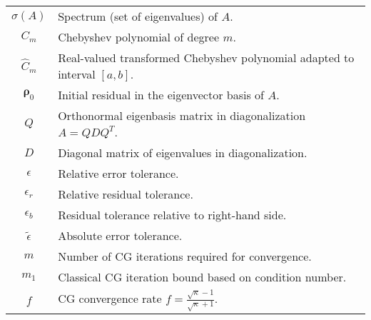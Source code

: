\begin{longtable}{c p{10cm}}
    $\sigma(A)$                      & Spectrum (set of eigenvalues) of $A$.                                                                       \\
    $C_m$                            & Chebyshev polynomial of degree $m$.                                                                         \\
    $\hat{C}_m$                      & Real-valued transformed Chebyshev polynomial adapted to interval $[a,b]$.                                   \\
    $\mathbf{\rho}_0$                & Initial residual in the eigenvector basis of $A$.                                                           \\
    $Q$                              & Orthonormal eigenbasis matrix in diagonalization $A = QDQ^T$.                                               \\
    $D$                              & Diagonal matrix of eigenvalues in diagonalization.                                                          \\
    $\epsilon$                       & Relative error tolerance.                                                                                   \\
    $\epsilon_r$                     & Relative residual tolerance.                                                                                \\
    $\epsilon_b$                     & Residual tolerance relative to right-hand side.                                                             \\
    $\tilde{\epsilon}$               & Absolute error tolerance.                                                                                   \\
    $m$                              & Number of CG iterations required for convergence.                                                           \\
    $m_1$                            & Classical CG iteration bound based on condition number.                                                     \\
    $f$                              & CG convergence rate $f = \frac{\sqrt{\kappa} - 1}{\sqrt{\kappa} + 1}$.                                      \\
\end{longtable}

